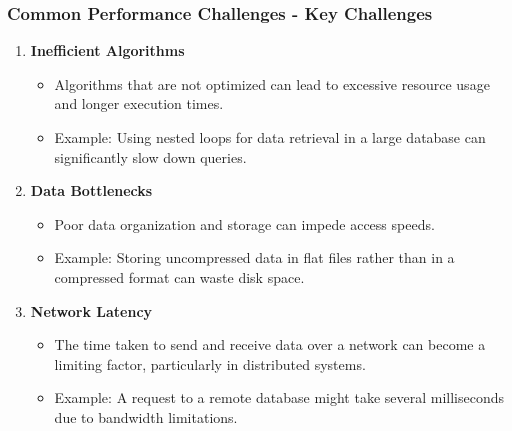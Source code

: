 \documentclass[aspectratio=169]{beamer}
\begin{document}
\begin{frame}[fragile]
    \frametitle{Common Performance Challenges - Key Challenges}
    \begin{enumerate}
        \item \textbf{Inefficient Algorithms}
        \begin{itemize}
            \item Algorithms that are not optimized can lead to excessive resource usage and longer execution times.
            \item Example: Using nested loops for data retrieval in a large database can significantly slow down queries.
        \end{itemize}
        
        \item \textbf{Data Bottlenecks}
        \begin{itemize}
            \item Poor data organization and storage can impede access speeds.
            \item Example: Storing uncompressed data in flat files rather than in a compressed format can waste disk space.
        \end{itemize}
        
        \item \textbf{Network Latency}
        \begin{itemize}
            \item The time taken to send and receive data over a network can become a limiting factor, particularly in distributed systems.
            \item Example: A request to a remote database might take several milliseconds due to bandwidth limitations.
        \end{itemize}
    \end{enumerate}
\end{frame}
\end{document}
